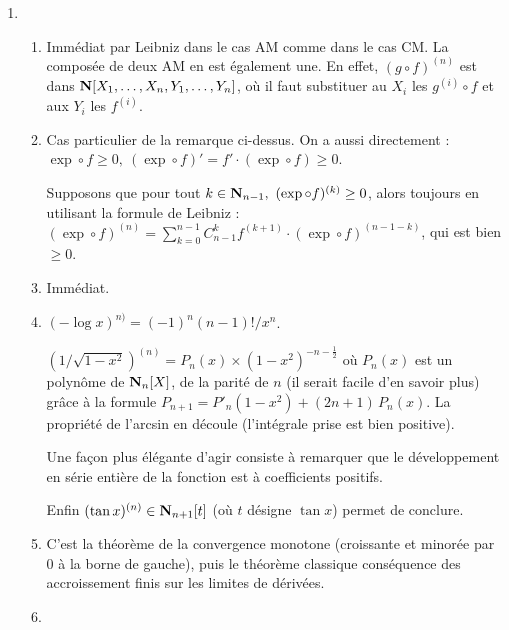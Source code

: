 \documentclass[a4paper]{article}
\begin{document}
\begin{enumerate}
\item %
\begin{enumerate}


\item 

	Imm\'ediat par Leibniz dans le cas AM comme dans le cas CM. La compos\'ee
de deux AM en est \'egalement une. En effet, $(g\circ f)^{(n)}$ est dans
$\mathbf{N}[X_1,\ldots,X_n,Y_1,\ldots,Y_n]$, o\`u il faut substituer au $X_i$
les $g^{(i)}\circ f$ et aux $Y_i$ les $f^{(i)}$.

\item

 Cas particulier de la remarque ci-dessus. On a aussi directement :
$\exp\circ f\ge0,\ (\exp\circ f)'=f'\cdot(\exp\circ f)\ge0$.

	Supposons que pour tout $k\in\NN_{n-1},\ (\exp\circ f)^{(k)}\ge0$,
alors toujours en utilisant la formule de Leibniz : $(\exp\circ
f)^{(n)}=\sum_{k=0}^{n-1}C_{n-1}^kf^{(k+1)}\cdot(\exp\circ
f)^{(n-1-k)}$, qui est bien $\geq0$.

 

\item 

	Imm\'ediat.

\item

	$(-\log x)^{n)}=(-1)^n (n-1)!/x^n$.

	$(1/\sqrt{1-x^2})^{(n)}=P_n(x)\times (1-x^2)^{-n-\frac12}$ o\`u $P_n(x)$
est un polyn\^ome de $\mathbf{N}_n[X]$, de la parit\'e de $n$ (il serait facile
d'en savoir plus) gr\^ace \`a la formule $P_{n+1}=P'_n(1-x^2)+(2n+1)\,
P_n(x)$. La propri\'et\'e de l'arcsin en d\'ecoule (l'int\'egrale prise est
bien positive).

	Une fa\c{c}on plus \'el\'egante d'agir consiste \`a remarquer que le
d\'eveloppement en s\'erie enti\`ere de la fonction est \`a coefficients positifs.

	Enfin $(\tan x)^{(n)}\in \mathbf{N}_{n+1}[t]$ (o\`u $t$ d\'esigne $\tan x$)
permet de conclure.

\item

 C'est la th\'eor\`eme de la convergence monotone (croissante et minor\'ee
par 0 \`a la borne de gauche), puis le th\'eor\`eme classique cons\'equence des
accroissement finis sur les limites de d\'eriv\'ees.

\item


\end{enumerate}
\end{enumerate}
\end{document}
